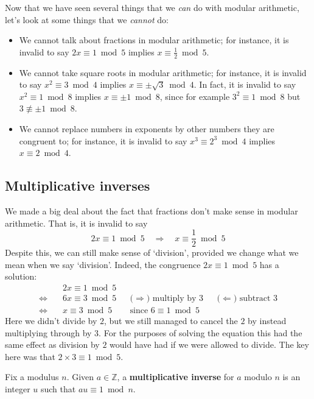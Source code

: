 \begin{example}
Now that we have seen several things that we \textit{can} do with modular arithmetic, let's look at some things that we \textit{cannot} do:
\begin{itemize}
\item We cannot talk about fractions in modular arithmetic; for instance, it is invalid to say $2x \equiv 1 \bmod 5$ implies $x \equiv \frac{1}{2} \bmod 5$.
\item We cannot take square roots in modular arithmetic; for instance, it is invalid to say $x^2 \equiv 3 \bmod 4$ implies $x \equiv \pm \sqrt{3} \bmod 4$. In fact, it is invalid to say $x^2 \equiv 1 \bmod 8$ implies $x \equiv \pm 1 \bmod 8$, since for example $3^2 \equiv 1 \bmod 8$ but $3 \not\equiv \pm 1 \bmod 8$.
\item We cannot replace numbers in exponents by other numbers they are congruent to; for instance, it is invalid to say $x^3 \equiv 2^3 \bmod 4$ implies $x \equiv 2 \bmod 4$.
\end{itemize}
\end{example}

\subsection*{Multiplicative inverses}

We made a big deal about the fact that fractions don't make sense in modular arithmetic. That is, it is invalid to say
\[ 2x \equiv 1 \bmod 5 \quad \Rightarrow \quad x \equiv \frac{1}{2} \bmod 5 \]
Despite this, we can still make sense of `division', provided we change what we mean when we say `division'. Indeed, the congruence $2x \equiv 1 \bmod 5$ has a solution:
\begin{align*}
& 2x \equiv 1 \bmod 5 && && \\
\Leftrightarrow\quad & 6x \equiv 3 \bmod 5 && \text{($\Rightarrow$) multiply by $3$} && \text{($\Leftarrow$) subtract $3$} \\
\Leftrightarrow\quad & x \equiv 3 \bmod 5 && \text{since $6 \equiv 1 \bmod 5$}
\end{align*}
Here we didn't divide by $2$, but we still managed to cancel the $2$ by instead multiplying through by $3$. For the purposes of solving the equation this had the same effect as division by $2$ would have had if we were allowed to divide. The key here was that $2 \times 3 \equiv 1 \bmod 5$.

\begin{definition}\label{multiplicative inverse}
Fix a modulus $n$. Given $a \in \mathbb{Z}$, a \textbf{multiplicative inverse} for $a$ modulo $n$ is an integer $u$ such that $au \equiv 1 \bmod n$.
\end{definition}

